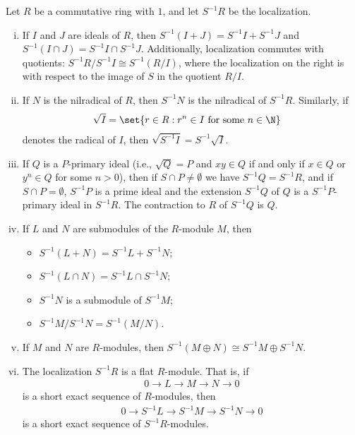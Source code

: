 \documentclass[10pt]{mypackage}
\begin{document}
\begin{proposition}
  Let $R$ be a commutative ring with $1$, and let $S^{-1}R$ be the localization.
  \begin{enumerate}[(i)]
    \item If $I$ and $J$ are ideals of $R$, then $S^{-1}\left( I + J \right) = S^{-1}I + S^{-1}J$ and $S^{-1}\left( I \cap J \right) = S^{-1}I\cap S^{-1}J$. Additionally, localization commutes with quotients: $S^{-1}R/S^{-1}I \cong S^{-1}\left( R/I \right)$, where the localization on the right is with respect to the image of $S$ in the quotient $R/I$.
    \item If $N$ is the nilradical of $R$, then $S^{-1}N$ is the nilradical of $S^{-1}R$. Similarly, if 
      \begin{align*}
        \sqrt{I} &= \set{r\in R : r^{n} \in I\text{ for some }n\in \N}
      \end{align*}
      denotes the radical of $I$, then $\sqrt{S^{-1}I} = S^{-1}\sqrt{I}$.
    \item If $Q$ is a $P$-primary ideal (i.e., $\sqrt{Q} = P$ and $xy\in Q$ if and only if $x\in Q$ or $y^{n}\in Q$ for some $n > 0$), then if $S\cap P \neq \emptyset$ we have $S^{-1}Q = S^{-1}R$, and if $S\cap P = \emptyset$, $S^{-1}P$ is a prime ideal and the extension $S^{-1}Q$ of $Q$ is a $S^{-1}P$-primary ideal in $S^{-1}R$. The contraction to $R$ of $S^{-1}Q$ is $Q$.
    \item If $L$ and $N$ are submodules of the $R$-module $M$, then
      \begin{itemize}
        \item $S^{-1}\left( L + N \right) = S^{-1}L + S^{-1}N$;
        \item $S^{-1}\left( L\cap N \right) = S^{-1}L\cap S^{-1}N$;
        \item $S^{-1}N$ is a submodule of $S^{-1}M$;
        \item $S^{-1}M/S^{-1}N = S^{-1}\left( M/N \right)$.
      \end{itemize}
    \item If $M$ and $N$ are $R$-modules, then $S^{-1}\left( M\oplus N \right)\cong S^{-1}M\oplus S^{-1}N$.
    \item The localization $S^{-1}R$ is a flat $R$-module. That is, if
      \begin{align*}
        0 \rightarrow L\rightarrow M\rightarrow N\rightarrow 0
      \end{align*}
      is a short exact sequence of $R$-modules, then 
      \begin{align*}
        0\rightarrow S^{-1}L\rightarrow S^{-1}M\rightarrow S^{-1}N\rightarrow 0
      \end{align*}
      is a short exact sequence of $S^{-1}R$-modules.
  \end{enumerate}
\end{proposition}
\end{document}

